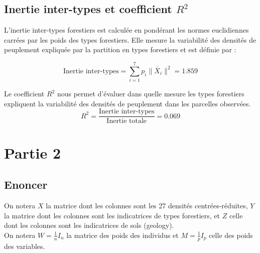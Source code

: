 \documentclass{article}
\begin{document}
\subsection{Inertie inter-types et coefficient $R^2$}


L'inertie inter-types forestiers est calculée en pondérant les normes euclidiennes carrées par les poids des types forestiers. Elle mesure la variabilité des densités de peuplement expliquée par la partition en types forestiers et est définie par :

\[
\text{Inertie inter-types} = \sum_{i=1}^{7} p_i \|\bar{X}_i\|^2 = 1.859
\]

Le coefficient $R^2$ nous permet d'évaluer dans quelle mesure les types forestiers expliquent la variabilité des densités de peuplement dans les parcelles observées.
\[
R^2 = \frac{\text{Inertie inter-types}}{\text{Inertie totale}}=0.069
\]



\newpage
\section{Partie 2}
\subsection{Enoncer}
On notera $X$ la matrice dont les colonnes sont les 27 densités centrées-réduites, $Y$ la
matrice dont les colonnes sont les indicatrices de types forestiers, et $Z$ celle dont les
colonnes sont les indicatrices de sols (geology). \\
On notera $W=\frac{1}{n}I_n$ la matrice des poids des individus et $M=\frac{1}{p}I_p$
celle des poids des variables.
\end{document}
